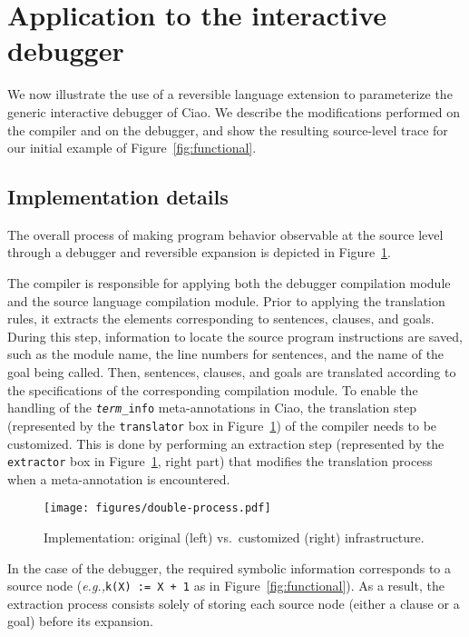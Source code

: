 \documentclass[preprint]{llncs}
\newcommand{\eg}{\emph{e.g.,\xspace}}
\newcommand{\pre}[1]{\texttt{#1}}
\begin{document}
{\section{Application to the interactive debugger}
\label{sec:application}

We now illustrate the use of a reversible language extension to
parameterize the generic interactive debugger of Ciao. We describe the
modifications performed on the compiler and on the debugger, and show
the resulting source-level trace for our initial example of
Figure~\ref{fig:functional}.

\subsection{Implementation details}

The overall process of making program behavior observable at the
source level through a debugger and reversible expansion is depicted
in Figure~\ref{fig:double-process}.

The compiler is responsible for applying both the debugger compilation
module and the source language compilation module. Prior to applying
the translation rules, it extracts the elements corresponding to
sentences, clauses, and goals. During this step, information to locate
the source program instructions are saved, such as the module name,
the line numbers for sentences, and the name of the goal being called.
Then, sentences, clauses, and goals are translated according to the
specifications of the corresponding compilation module. To enable the
handling of the \pre{\emph{term}\_info} meta-annotations in Ciao, the
translation step (represented by the \pre{translator} box in
Figure~\ref{fig:double-process}) of the compiler needs to be
customized. This is done by performing an extraction step (represented
by the \pre{extractor} box in Figure~\ref{fig:double-process}, right
part) that modifies the translation process when a meta-annotation is
encountered.

\begin{figure}[t!]
    \centering
    \texttt{[image: figures/double-process.pdf]}
    \caption{Implementation: original (left) vs.\ customized (right)
    infrastructure.}
    \label{fig:double-process}
\end{figure}


In the case of the debugger, the required symbolic information
corresponds to a source node (\eg \pre{k(X) := X + 1} as in
Figure~\ref{fig:functional}). As a result, the extraction process
consists solely of storing each source node (either a clause or a
goal) before its expansion.

}
\end{document}
